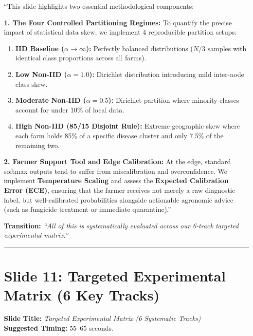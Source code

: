 \documentclass[11pt,a4paper]{article}
\begin{document}
\begin{tcolorbox}[colframe=darkgreen, title=\textbf{What to Say in the Presentation (Literal Script)}]
``This slide highlights two essential methodological components:

\textbf{1. The Four Controlled Partitioning Regimes:}
To quantify the precise impact of statistical data skew, we implement 4 reproducible partition setups:
\begin{enumerate}
    \item \textbf{IID Baseline ($\alpha \to \infty$):} Perfectly balanced distributions ($N/3$ samples with identical class proportions across all farms).
    \item \textbf{Low Non-IID ($\alpha = 1.0$):} Dirichlet distribution introducing mild inter-node class skew.
    \item \textbf{Moderate Non-IID ($\alpha = 0.5$):} Dirichlet partition where minority classes account for under 10\% of local data.
    \item \textbf{High Non-IID (85/15 Disjoint Rule):} Extreme geographic skew where each farm holds 85\% of a specific disease cluster and only 7.5\% of the remaining two.
\end{enumerate}

\textbf{2. Farmer Support Tool and Edge Calibration:}
At the edge, standard softmax outputs tend to suffer from miscalibration and overconfidence. We implement \textbf{Temperature Scaling} and assess the \textbf{Expected Calibration Error (ECE)}, ensuring that the farmer receives not merely a raw diagnostic label, but well-calibrated probabilities alongside actionable agronomic advice (such as fungicide treatment or immediate quarantine).''
\end{tcolorbox}

\textbf{Transition:} \textit{``All of this is systematically evaluated across our 6-track targeted experimental matrix.''}

\vspace{0.35cm}\hrule\vspace{0.35cm}

\section{Slide 11: Targeted Experimental Matrix (6 Key Tracks)}
\textbf{Slide Title:} \textit{Targeted Experimental Matrix (6 Systematic Tracks)} \\
\textbf{Suggested Timing:} 55--65 seconds.
\end{document}
